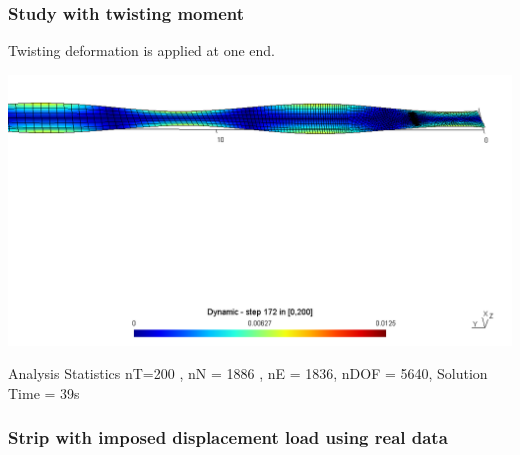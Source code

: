 \documentclass[9pt]{beamer}
\begin{document}
\begin{frame}\frametitle{Study with twisting moment}

Twisting deformation is applied at one end.

\begin{figure}[h!]
\centering

\end{figure}

\href{run:ParaStudy_onlydata/N2/3E7/Dynamic.mpg}{\includegraphics[width=1.0\textwidth,trim={0cm 15cm 0cm 1cm},clip]{ParaStudy_onlydata/twist.png}}


\begin{block}{Analysis Statistics}
nT=200 , nN = 1886 , nE = 1836, nDOF = 5640, Solution Time = 39s

\end{block}


\end{frame}










\begin{frame}\frametitle{Strip with imposed displacement load using real data }

\end{frame}
\end{document}
